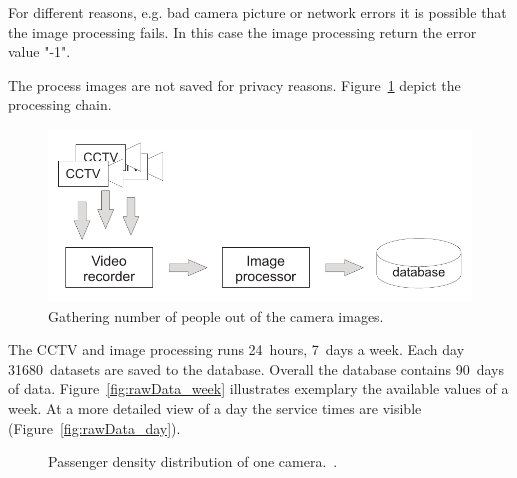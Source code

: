 For different reasons, e.g. bad camera picture or network errors it is possible that the image processing fails. In this case the image processing return the error value "-1".

The process images are not saved for privacy reasons. Figure~\ref{fig:CCTVimageProcessing} depict the processing chain.

\begin{figure}[htb]
  \centering
  \includegraphics[width=\linewidth]{Figures/imageProcessing.pdf} 
  \caption{Gathering number of people out of the camera images.}
  \label{fig:CCTVimageProcessing}
\end{figure}

The CCTV and image processing runs 24~hours, 7~days a week. Each day 31680~datasets are saved to the database. Overall the database contains 90~days of data.
Figure~\ref{fig:rawData_week} illustrates exemplary the available values of a week. At a more detailed view of a day the service times are visible (Figure~\ref{fig:rawData_day}).

\begin{figure}[tb]

  \centering

  \hfill

  \caption{Passenger density distribution of one camera.~\cite{TMB}.}
  \label{fig:rawData}

\end{figure}


